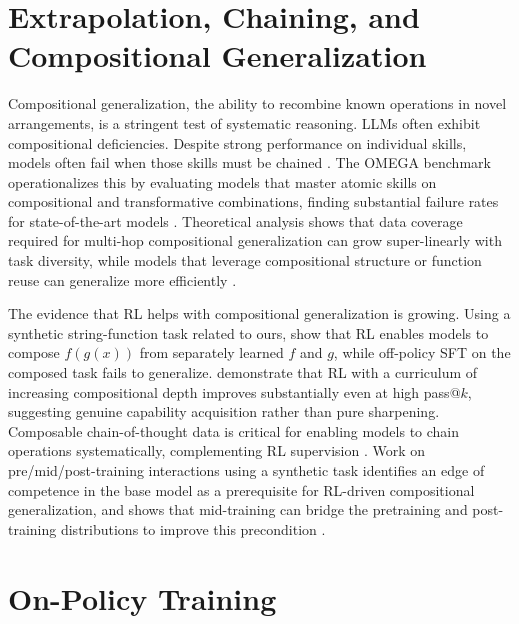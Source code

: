\documentclass[12pt]{cmuthesis}
\begin{document}
\section{Extrapolation, Chaining, and Compositional Generalization}

Compositional generalization, the ability to recombine known operations in novel arrangements, is a stringent test of systematic reasoning.
LLMs often exhibit compositional deficiencies. Despite strong performance on individual skills, models often fail when those skills must be chained \citep{pressMeasuringNarrowingCompositionality2023,zhaoExploringCompositionalDeficiency2024}.
The OMEGA benchmark operationalizes this by evaluating models that master atomic skills on compositional and transformative combinations, finding substantial failure rates for state-of-the-art models \citep{sunOMEGACanLLMs2025}.
Theoretical analysis shows that data coverage required for multi-hop compositional generalization can grow super-linearly with task diversity, while models that leverage compositional structure or function reuse can generalize more efficiently \citep{abedsoltanTaskGeneralizationAutoRegressive2025}.



The evidence that RL helps with compositional generalization is growing.
Using a synthetic string-function task related to ours, \citet{yuanLLMsLearnNewSkills2025} show that RL enables models to compose $f(g(x))$ from separately learned $f$ and $g$, while off-policy SFT on the composed task fails to generalize.
\citet{motwaniH1BootstrappingLLMs2025} demonstrate that RL with a curriculum of increasing compositional depth improves substantially even at high pass@$k$, suggesting genuine capability acquisition rather than pure sharpening.
Composable chain-of-thought data is critical for enabling models to chain operations systematically, complementing RL supervision \citep{yinLearningComposableChainsofThought2025}.
Work on pre/mid/post-training interactions using a synthetic task identifies an edge of competence in the base model as a prerequisite for RL-driven compositional generalization, and shows that mid-training can bridge the pretraining and post-training distributions to improve this precondition \citep{zhangInterplayPreTrainingMidTraining2025}.


\section{On-Policy Training}
\end{document}
